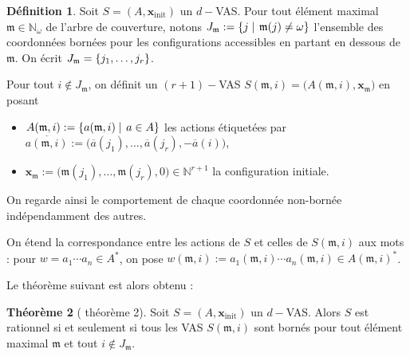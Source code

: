 \documentclass[a4paper,final]{article}
\theoremstyle{definition}
\newtheorem{Theorem}{Théorème}
\newtheorem{Definition}[Theorem]{Définition}
\newcommand{\set}[2]{\left\{#1\mathrel{\left|\vphantom{#1}\vphantom{#2}\right.}#2\right\}}
\newcommand{\os}[1]{\left\{\mathinner{#1}\right\}}
\newcommand{\N}{\ensuremath{\mathbb{N}}}
\newcommand{\Nomega}{\ensuremath{\mathbb{N}_\omega}}
\newcommand{\vect}[1]{\ensuremath{\mathbf{#1}}}
\newcommand{\xinit}{\ensuremath{\vect{x}_\text{init}}}
\newcommand{\valeur}[1]{\ensuremath{\overline{#1}}}
\begin{document}
\begin{Definition}
Soit $S=(A,\xinit)$ un $d-$VAS.
Pour tout élément maximal $\mathfrak{m}\in\Nomega$ de l'arbre de couverture, notons $J_\mathfrak{m}:=\set{j}{\mathfrak{m}(j)\neq \omega}$ l'ensemble des coordonnées bornées pour les configurations accessibles en partant en dessous de $\mathfrak{m}$.
On écrit $J_\mathfrak{m}=\os{j_1,\dots,j_r}$.

Pour tout $i\notin J_\mathfrak{m}$, on définit un $(r+1)-$VAS $S(\mathfrak{m},i) = \big(A(\mathfrak{m},i), \vect{x}_\mathfrak{m}\big)$ en posant
\begin{itemize}
    \item $A(\mathfrak{m},i) := \set{a(\mathfrak{m},i)} {a\in A}$ 
    les actions étiquetées par $\valeur{a(\mathfrak{m},i)} := \big(\valeur{a}(j_1), \dots, \valeur{a}(j_r), -\valeur{a}(i) \big)$,
    \item $\vect{x}_\mathfrak{m} := \big(\mathfrak{m}(j_1), \dots, \mathfrak{m}(j_r), 0\big) \in \N^{r+1}$ la configuration initiale.
\end{itemize}
\end{Definition}

\noindent On regarde ainsi le comportement de chaque coordonnée non-bornée indépendamment des autres.

On étend la correspondance entre les actions de $S$ et celles de $S(\mathfrak{m},i)$ aux mots : 
pour $w = a_1\cdots a_n \in A^\ast$, on pose $w(\mathfrak{m},i) := a_1(\mathfrak{m},i) \cdots a_n(\mathfrak{m},i) \in A(\mathfrak{m},i)^\ast$.

Le théorème suivant est alors obtenu :

\begin{Theorem}[\cite{giyo80} théorème 2]
    Soit $S=(A,\xinit)$ un $d-$VAS.
    Alors $S$ est rationnel si et seulement si 
    tous les VAS $S(\mathfrak{m},i)$ sont bornés pour tout élément maximal $\mathfrak{m}$ et tout $i\notin J_\mathfrak{m}$.
\end{Theorem}
\end{document}
